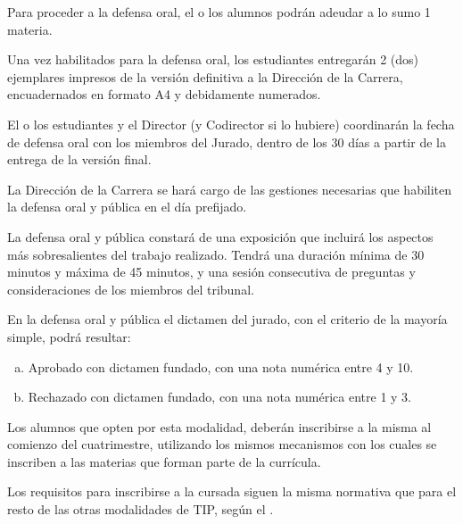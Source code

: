 
\articulo Para proceder a la defensa oral, el o los alumnos podrán adeudar a lo
sumo 1 materia. 

\articulo Una vez habilitados para la defensa oral, los estudiantes
entregarán 2 (dos) ejemplares impresos de la versión definitiva a la Dirección de la
Carrera, encuadernados en formato A4 y debidamente numerados.

\articulo El o los estudiantes y el Director (y Codirector si lo hubiere)
coordinarán la fecha de defensa oral con los miembros del Jurado, dentro de los 30
días a partir de la entrega de la versión final.

\articulo La Dirección de la Carrera se hará cargo de las gestiones
necesarias que habiliten la defensa oral y pública en el día prefijado.

\articulo La defensa oral y pública constará de una exposición que incluirá
los aspectos más sobresalientes del trabajo realizado. Tendrá una duración mínima de
30 minutos y máxima de 45 minutos, y una sesión consecutiva de preguntas y
consideraciones de los miembros del tribunal.

\articulo En la defensa oral y pública el dictamen del jurado, con el criterio
de la mayoría simple, podrá resultar: 
\begin{enumerate}[a.]
\item Aprobado con dictamen fundado, con una nota numérica entre 4 y 10.
\item Rechazado con dictamen fundado, con una nota numérica entre 1 y 3.
\end{enumerate}




\articulo Los alumnos que opten por esta modalidad, deberán inscribirse a la
misma al comienzo del cuatrimestre, utilizando los mismos
mecanismos con los cuales se inscriben a las materias que forman parte de la currícula. 

\articulo Los requisitos para inscribirse a la cursada siguen la misma normativa
que para el resto de las otras modalidades de TIP, según el \artCondInscripcion.

